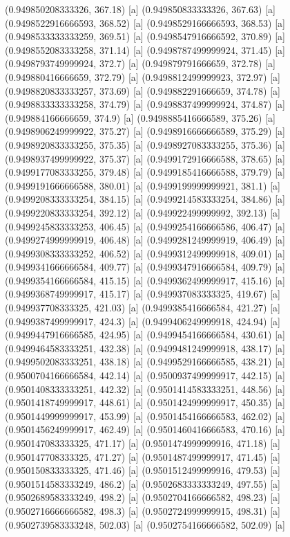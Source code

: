 {{{(0.949850208333326, 367.18) [a] 
(0.949850833333326, 367.63) [a] 
(0.9498522916666593, 368.52) [a] 
(0.9498529166666593, 368.53) [a] 
(0.9498533333333259, 369.51) [a] 
(0.9498547916666592, 370.89) [a] 
(0.9498552083333258, 371.14) [a] 
(0.9498787499999924, 371.45) [a] 
(0.9498793749999924, 372.7) [a] 
(0.949879791666659, 372.78) [a] 
(0.949880416666659, 372.79) [a] 
(0.9498812499999923, 372.97) [a] 
(0.9498820833333257, 373.69) [a] 
(0.949882291666659, 374.78) [a] 
(0.9498833333333258, 374.79) [a] 
(0.9498837499999924, 374.87) [a] 
(0.949884166666659, 374.9) [a] 
(0.9498885416666589, 375.26) [a] 
(0.9498906249999922, 375.27) [a] 
(0.9498916666666589, 375.29) [a] 
(0.9498920833333255, 375.35) [a] 
(0.9498927083333255, 375.36) [a] 
(0.9498937499999922, 375.37) [a] 
(0.9499172916666588, 378.65) [a] 
(0.9499177083333255, 379.48) [a] 
(0.9499185416666588, 379.79) [a] 
(0.9499191666666588, 380.01) [a] 
(0.9499199999999921, 381.1) [a] 
(0.9499208333333254, 384.15) [a] 
(0.9499214583333254, 384.86) [a] 
(0.9499220833333254, 392.12) [a] 
(0.949922499999992, 392.13) [a] 
(0.9499245833333253, 406.45) [a] 
(0.9499254166666586, 406.47) [a] 
(0.9499274999999919, 406.48) [a] 
(0.9499281249999919, 406.49) [a] 
(0.9499308333333252, 406.52) [a] 
(0.9499312499999918, 409.01) [a] 
(0.9499341666666584, 409.77) [a] 
(0.9499347916666584, 409.79) [a] 
(0.9499354166666584, 415.15) [a] 
(0.9499362499999917, 415.16) [a] 
(0.9499368749999917, 415.17) [a] 
(0.949937083333325, 419.67) [a] 
(0.949937708333325, 421.03) [a] 
(0.9499385416666584, 421.27) [a] 
(0.9499387499999917, 424.3) [a] 
(0.9499406249999918, 424.94) [a] 
(0.9499447916666585, 424.95) [a] 
(0.9499454166666584, 430.61) [a] 
(0.9499464583333251, 432.38) [a] 
(0.9499481249999918, 438.17) [a] 
(0.9499502083333251, 438.18) [a] 
(0.9499529166666585, 438.21) [a] 
(0.9500704166666584, 442.14) [a] 
(0.9500937499999917, 442.15) [a] 
(0.9501408333333251, 442.32) [a] 
(0.9501414583333251, 448.56) [a] 
(0.9501418749999917, 448.61) [a] 
(0.9501424999999917, 450.35) [a] 
(0.9501449999999917, 453.99) [a] 
(0.9501454166666583, 462.02) [a] 
(0.9501456249999917, 462.49) [a] 
(0.9501460416666583, 470.16) [a] 
(0.950147083333325, 471.17) [a] 
(0.9501474999999916, 471.18) [a] 
(0.950147708333325, 471.27) [a] 
(0.9501487499999917, 471.45) [a] 
(0.950150833333325, 471.46) [a] 
(0.9501512499999916, 479.53) [a] 
(0.9501514583333249, 486.2) [a] 
(0.9502683333333249, 497.55) [a] 
(0.9502689583333249, 498.2) [a] 
(0.9502704166666582, 498.23) [a] 
(0.9502716666666582, 498.3) [a] 
(0.9502724999999915, 498.31) [a] 
(0.9502739583333248, 502.03) [a] 
(0.9502754166666582, 502.09) [a] 
}}}
